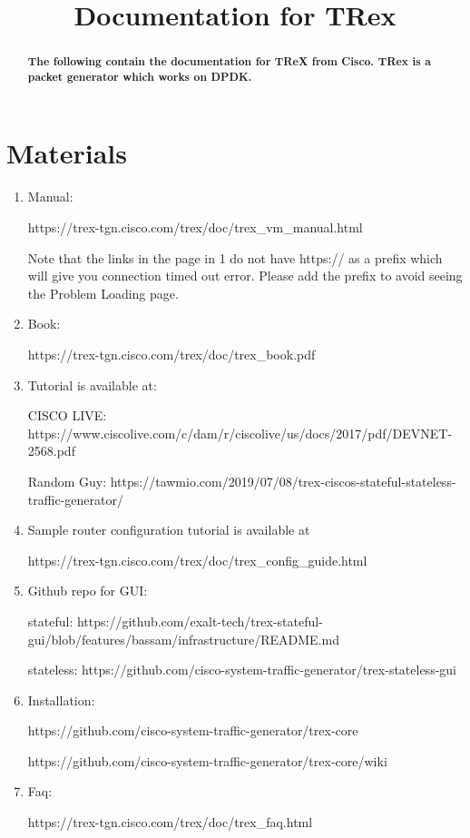 \documentclass[conference, english, letterpaper, onecolumn, draft]{IEEEtran}
\begin{document}
\title{Documentation for TRex}

\author{
}

\maketitle

\begin{abstract}
\textbf{The following contain the documentation for TReX from Cisco. TRex is a packet generator which works on DPDK.}
\end{abstract}
\section{Materials}
\begin{enumerate}
\item Manual: 

https://trex-tgn.cisco.com/trex/doc/trex_vm_manual.html

Note that the links in the page in 1 do not have https:// as a prefix which will give you connection timed out error.
Please add the prefix to avoid seeing the Problem Loading page.

\item Book: 

https://trex-tgn.cisco.com/trex/doc/trex_book.pdf

\item Tutorial is available at:

CISCO LIVE: https://www.ciscolive.com/c/dam/r/ciscolive/us/docs/2017/pdf/DEVNET-2568.pdf

Random Guy: https://tawmio.com/2019/07/08/trex-ciscos-stateful-stateless-traffic-generator/

\item Sample router configuration tutorial is available at

https://trex-tgn.cisco.com/trex/doc/trex_config_guide.html

\item Github repo for GUI:

stateful: 	https://github.com/exalt-tech/trex-stateful-gui/blob/features/bassam/infrastructure/README.md

stateless: 	https://github.com/cisco-system-traffic-generator/trex-stateless-gui

\item Installation:

https://github.com/cisco-system-traffic-generator/trex-core

https://github.com/cisco-system-traffic-generator/trex-core/wiki

\item Faq:

https://trex-tgn.cisco.com/trex/doc/trex_faq.html

\end{enumerate}
\end{document}
